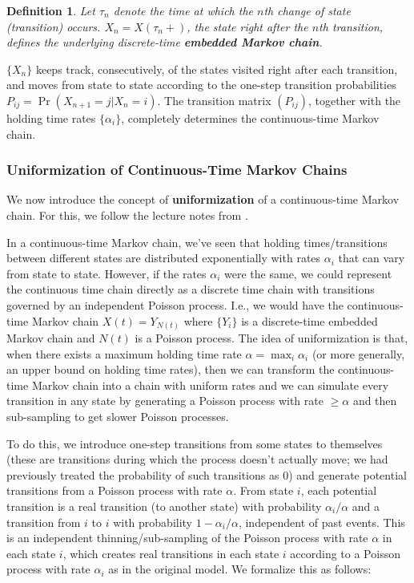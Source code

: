 \documentclass[11pt]{article}
\newtheorem{definition}{Definition}[section]
\begin{document}
\begin{definition}
Let $\tau_n$ denote the time at which the $n$th change of state (transition) occurs. $X_n = X(\tau_n+)$, the state right after the $n$th transition, defines the underlying discrete-time \textbf{embedded Markov chain}.
\end{definition}
$\{X_n\}$ keeps track, consecutively, of the states visited right after each transition, and moves from state to state according to the one-step transition probabilities $P_{ij} = \Pr(X_{n+1}=j|X_n=i)$. The transition matrix $(P_{ij})$, together with the holding time rates $\{\alpha_i\}$, completely determines the continuous-time Markov chain.

\subsubsection{Uniformization of Continuous-Time Markov Chains}

We now introduce the concept of \textbf{uniformization} of a continuous-time Markov chain. For this, we follow the lecture notes from \cite{whitt:ctmc}.

In a continuous-time Markov chain, we've seen that holding times/transitions between different states are distributed exponentially with rates $\alpha_i$ that can vary from state to state. However, if the rates $\alpha_i$ were the same, we could represent the continuous time chain directly as a discrete time chain with transitions governed by an independent Poisson process. I.e., we would have the continuous-time Markov chain $X(t) = Y_{N(t)}$ where $\{Y_i\}$ is a discrete-time embedded Markov chain and $N(t)$ is a Poisson process. The idea of uniformization is that, when there exists a maximum holding time rate $\alpha = \max_i \alpha_i$ (or more generally, an upper bound on holding time rates), then we can transform the continuous-time Markov chain into a chain with uniform rates and we can simulate every transition in any state by generating a Poisson process with rate $\geq \alpha$ and then sub-sampling to get slower Poisson processes.

To do this, we introduce one-step transitions from some states to themselves (these are transitions during which the process doesn't actually move; we had previously treated the probability of such transitions as 0) and generate potential transitions from a Poisson process with rate $\alpha$. From state $i$, each potential transition is a real transition (to another state) with probability $\alpha_i/\alpha$ and a transition from $i$ to $i$ with probability $1-\alpha_i/\alpha$, independent of past events. This is an independent thinning/sub-sampling of the Poisson process with rate $\alpha$ in each state $i$, which creates real transitions in each state $i$ according to a Poisson process with rate $\alpha_i$ as in the original model. We formalize this as follows:
\end{document}
